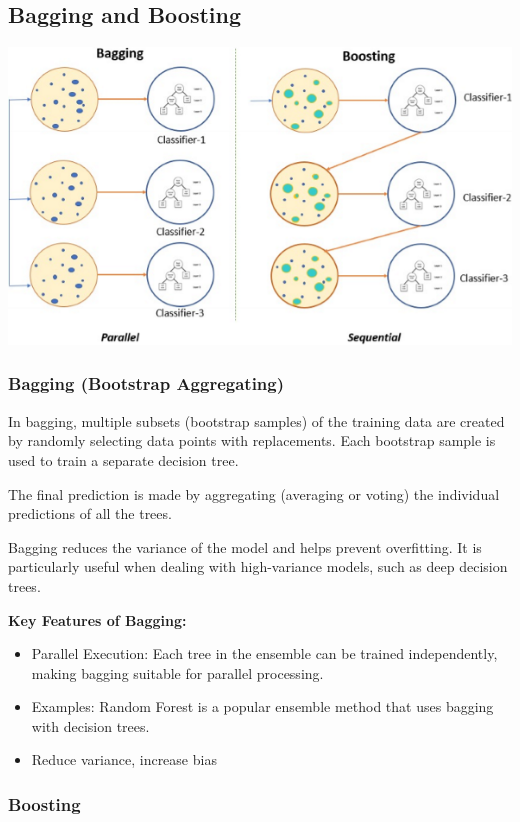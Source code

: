 \documentclass[letterpaper,12pt]{article}
\begin{document}
\subsection{Bagging and Boosting}
\includegraphics*{./Image/Bagging and Boosting.png}


\subsubsection{Bagging (Bootstrap Aggregating)}

In bagging, multiple subsets (bootstrap samples) of the training data are created by randomly selecting data points with replacements. Each bootstrap sample is used to train a separate decision tree.

The final prediction is made by aggregating (averaging or voting) the individual predictions of all the trees.

Bagging reduces the variance of the model and helps prevent overfitting. It is particularly useful when dealing with high-variance models, such as deep decision trees.

\textbf{Key Features of Bagging:}
\begin{itemize}
    \item Parallel Execution: Each tree in the ensemble can be trained independently, making bagging suitable for parallel processing.
    \item Examples: Random Forest is a popular ensemble method that uses bagging with decision trees.
    \item Reduce variance, increase bias
\end{itemize}

\subsubsection{Boosting}
\end{document}
